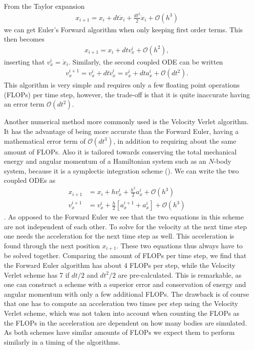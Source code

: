\documentclass[twocolumn]{aastex62}
\begin{document}
From the Taylor expansion 
\begin{align}
    x_{i+1} = x_i + dt\dot{x}_i + \frac{dt^2}{2}\ddot{x}_i + \mathcal{O}(h^3)
\end{align}
we can get Euler's Forward algorithm when only keeping first order terms.
This then becomes 
\begin{align}
    x_{i+1} = x_i + dtv_x^i + \mathcal{O}(h^2),
\end{align}
inserting that $v_x^i = \dot{x}_i$. Similarly, the second coupled ODE can be
written
\begin{align}
    v_x^{i+1} = v_x^i + dt  \dot{v}_x^i = v_x^i + dt  a_x^i + \mathcal{O}(dt^2).
\end{align} 
This algorithm is very simple and requires only a few floating point operations
(FLOPs) per time step, however, the trade-off is that it is quite
inaccurate having an error term $\mathcal{O}(dt^2)$.

Another numerical method more commonly used is the Velocity Verlet algorithm. It
has the advantage of being more accurate than the Forward Euler, having a
mathematical error term of $\mathcal{O}(dt^3)$, in addition to requiring about
the same amount of FLOPs. Also it is tailored towards conserving the total
mechanical energy and angular momentum of a Hamiltonian system such as an
$N$-body system, because it is a symplectic integration scheme (\cite{holmes:2007}). We can write the
two coupled ODEs as 
\begin{align}
    x_{i+1} &= x_i + hv_x^i + \frac{h^2}{2}a_x^i + \mathcal{O}(h^3)\\
    v_x^{i+1} &= v_x^i + \frac{h}{2}[a_x^{i+1} + a_x^i] + \mathcal{O}(h^3)
\end{align}
\cite{jensen:2015}.
As opposed to the Forward Euler we see that the two equations in this scheme are
not independent of each other. To solve for the velocity at the next time step one
needs the acceleration for the next time step as well. This acceleration is
found through the next position $x_{i+1}$. These two equations thus always have
to be solved together. Comparing the amount of FLOPs per time step, we find that
the Forward Euler algorithm has about 4 FLOPs per step, while the Velocity
Verlet scheme has 7 if $dt/2$ and $dt^2/2$ are pre-calculated. This is remarkable,
as one can construct a scheme with a superior error and conservation of energy and
angular momentum with only a few additional FLOPs. The drawback is of course that one
has to compute an acceleration two times per step using the Velocity Verlet
scheme, which was not taken into account when counting the FLOPs as the FLOPs in
the acceleration are dependent on how many bodies are simulated.
As both schemes have similar amounts of FLOPs we expect them to perform
similarly in a timing of the algorithms.
\end{document}
